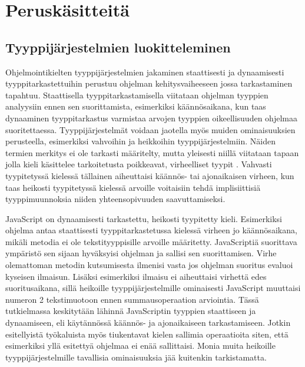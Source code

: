 \chapter{Peruskäsitteitä}

\section{Tyyppijärjestelmien luokitteleminen}
Ohjelmointikielten tyyppijärjestelmien jakaminen staattisesti ja dynaamisesti
tyyppitarkastettuihin perustuu ohjelman kehitysvaiheeseen jossa tarkastaminen
tapahtuu. Staattisella tyyppitarkastamisella viitataan ohjelman tyyppien
analyysiin ennen sen suorittamista, esimerkiksi käännösaikana, kun taas
dynaaminen tyyppitarkastus varmistaa arvojen tyyppien oikeellisuuden ohjelmaa
suoritettaessa. Tyyppijärjestelmät voidaan jaotella myös muiden
ominaisuuksien perusteella, esimerkiksi vahvoihin ja heikkoihin
tyyppijärjestelmiin. Näiden termien merkitys ei ole tarkasti määritelty,
mutta yleisesti niillä viitataan tapaan jolla kieli käsittelee tarkoitetusta
poikkeavat, virheelliset tyypit \cite{CornellTransitionToOO}. Vahvasti
tyypitetyssä kielessä tällainen aiheuttaisi käännös- tai ajonaikaisen
virheen, kun taas heikosti tyypitetyssä kielessä arvoille voitaisiin tehdä
implisiittisiä tyyppimuunnoksia niiden yhteensopivuuden saavuttamiseksi.

JavaScript on dynaamisesti tarkastettu, heikosti tyypitetty kieli.
Esimerkiksi ohjelma  antaa
staattisesti tyyppitarkastetussa kielessä virheen jo käännösaikana, mikäli
metodia  ei ole tekstityyppisille arvoille määritetty.
JavaScriptiä suorittava ympäristö sen sijaan hyväksyisi ohjelman ja sallisi
sen suorittamisen. Virhe olemattoman metodin kutsumisesta ilmenisi vasta jos
ohjelman suoritus evaluoi kyseisen ilmaisun. Lisäksi esimerkiksi ilmaisu
 ei aiheuttaisi virhettä edes 
suoritusaikana, sillä heikoille tyyppijärjestelmille ominaisesti JavaScript
muuttaisi numeron 2 tekstimuotoon ennen summausoperaation arviointia. Tässä
tutkielmassa keskitytään lähinnä JavaScriptin tyyppien staattiseen ja
dynaamiseen, eli käytännössä käännös- ja ajonaikaiseen tarkastamiseen. Jotkin
esitellyistä työkaluista myös tiukentavat kielen sallimia operaatioita siten,
että esimerkiksi yllä esitettyä  ohjelmaa
ei enää sallittaisi. Monia muita heikoille tyyppijärjestelmille
tavallisia ominaisuuksia jää kuitenkin tarkistamatta.

